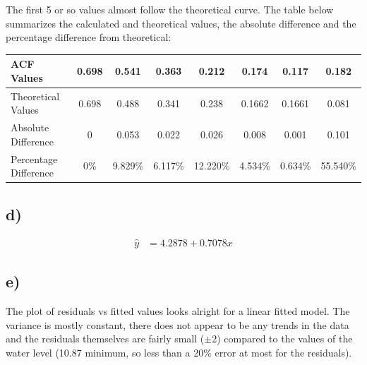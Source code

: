 \documentclass[paper=a4, fontsize=11pt]{scrartcl} %
\numberwithin{equation}{section} %
\numberwithin{figure}{section} %
\numberwithin{table}{section} %
\begin{document}
The first 5 or so values almost follow the theoretical curve. The table below summarizes the calculated and theoretical values, the absolute difference and the percentage difference from theoretical:

\begin{tabular}{| l | c | c | c | c | c | c | c |}
	\hline
	ACF Values & 0.698 & 0.541 & 0.363 & 0.212 & 0.174 & 0.117 & 0.182 \\ \hline
	Theoretical Values & 0.698 & 0.488 & 0.341 & 0.238 & 0.1662 & 0.1661 & 0.081 \\ \hline
	Absolute Difference & 0 & 0.053 & 0.022 & 0.026 & 0.008 & 0.001 & 0.101 \\ \hline
	Percentage Difference & 0\% & 9.829\% & 6.117\% & 12.220\% & 4.534\% & 0.634\% & 55.540\% \\ \hline
\end{tabular}

\subsection*{d)}

\begin{align*}
	\hat{y} &= 4.2878 + 0.7078x
\end{align*}

\subsection*{e)}	
The plot of residuals vs fitted values looks alright for a linear fitted model. The variance is mostly constant, there does not appear to be any trends in the data and the residuals themselves are fairly small ($\pm 2$) compared to the values of the water level (10.87 minimum, so less than a 20\% error at most for the residuals).

\end{document}
